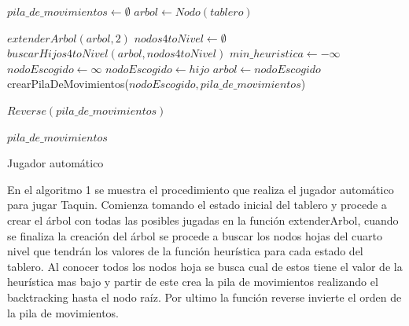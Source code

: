 \documentclass[a4paper]{article}
\theoremstyle{plain}
\theoremstyle{definition}
\begin{document}
	    \begin{algorithm}[H]
        \begin{algorithmic}[1]
        
        
            \State$pila\_de\_movimientos \leftarrow \emptyset$
            \State$arbol \leftarrow Nodo(tablero)$
        
            
                \State$extenderArbol(arbol, 2)$
                \State$nodos4toNivel \leftarrow \emptyset$
                \State$buscarHijos4toNivel(arbol, nodos4toNivel)$
                \State$min\_heuristica \leftarrow -\infty$
                \State $nodoEscogido \leftarrow \infty$
                        \State $nodoEscogido \leftarrow hijo$
                    \EndIf
                \EndFor
                \State $arbol \leftarrow nodoEscogido$
            \EndWhile
            \State crearPilaDeMovimientos($nodoEscogido, pila\_de\_movimientos$)
          
            \State $Reverse( pila\_de\_movimientos )$  
        
            \State\Return $pila\_de\_movimientos$
        \EndProcedure
        
        \end{algorithmic}
        
        \caption{Jugador automático}
        \end{algorithm}
        
        En el algoritmo 1 se muestra el procedimiento que realiza el jugador automático para jugar Taquin. Comienza tomando el estado inicial del tablero y procede a crear el árbol con todas las posibles jugadas en la función extenderArbol, cuando se finaliza la creación del árbol se procede a buscar los nodos hojas del cuarto nivel que tendrán los valores de la función heurística para cada estado del tablero. Al conocer todos los nodos hoja se busca cual de estos tiene el valor de la heurística mas bajo y partir de este crea la pila de movimientos realizando el backtracking hasta el nodo raíz. Por ultimo la función reverse invierte el orden de la pila de movimientos.
        
\end{document}
